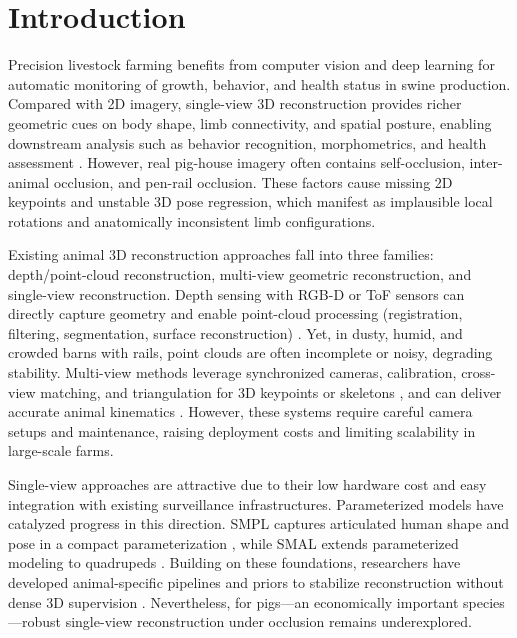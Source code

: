 \documentclass[computers,article,submit,pdftex,moreauthors]{mdpi}
\begin{document}
\section{Introduction}\label{sec:intro}

Precision livestock farming benefits from computer vision and deep learning for automatic monitoring of growth, behavior, and health status in swine production. Compared with 2D imagery, single-view 3D reconstruction provides richer geometric cues on body shape, limb connectivity, and spatial posture, enabling downstream analysis such as behavior recognition, morphometrics, and health assessment \cite{ref1,ref2,ref3,ref4,ref5,ref6,ref7,ref8,ref9,ref10}. However, real pig-house imagery often contains self-occlusion, inter-animal occlusion, and pen-rail occlusion. These factors cause missing 2D keypoints and unstable 3D pose regression, which manifest as implausible local rotations and anatomically inconsistent limb configurations.

Existing animal 3D reconstruction approaches fall into three families: depth/point-cloud reconstruction, multi-view geometric reconstruction, and single-view reconstruction. Depth sensing with RGB-D or ToF sensors can directly capture geometry and enable point-cloud processing (registration, filtering, segmentation, surface reconstruction) \cite{ref11,ref12,ref13,ref14}. Yet, in dusty, humid, and crowded barns with rails, point clouds are often incomplete or noisy, degrading stability. Multi-view methods leverage synchronized cameras, calibration, cross-view matching, and triangulation for 3D keypoints or skeletons \cite{ref15,ref16,ref17,ref18}, and can deliver accurate animal kinematics \cite{ref6}. However, these systems require careful camera setups and maintenance, raising deployment costs and limiting scalability in large-scale farms.

Single-view approaches are attractive due to their low hardware cost and easy integration with existing surveillance infrastructures. Parameterized models have catalyzed progress in this direction. SMPL captures articulated human shape and pose in a compact parameterization \cite{ref19}, while SMAL extends parameterized modeling to quadrupeds \cite{ref20,ref21,ref22,ref23,ref24}. Building on these foundations, researchers have developed animal-specific pipelines and priors to stabilize reconstruction without dense 3D supervision \cite{ref25,ref26}. Nevertheless, for pigs---an economically important species---robust single-view reconstruction under occlusion remains underexplored.
\end{document}
